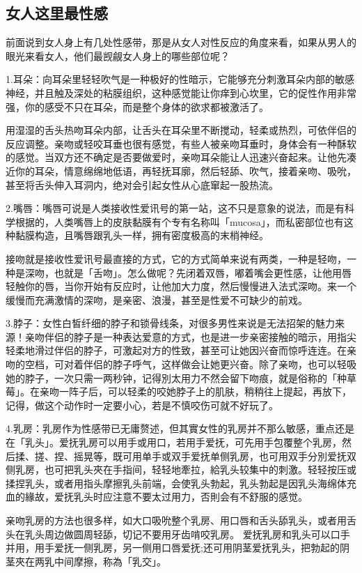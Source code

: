 \documentclass[12pt,UTF8]{ctexbook}
\begin{document}
\subsection{女人这里最性感}

前面说到女人身上有几处性感带，那是从女人对性反应的角度来看，如果从男人的眼光来看女人，他们最觊觎女人身上的哪些部位呢？

1.耳朵：向耳朵里轻轻吹气是一种极好的性暗示，它能够充分刺激耳朵内部的敏感神经，并且触及深处的粘膜组织，这种感觉能让你痒到心坎里，它的促性作用非常强，你的感受不只在耳朵，而是整个身体的欲求都被激活了。

用湿湿的舌头热吻耳朵内部，让舌头在耳朵里不断搅动，轻柔或热烈，可依伴侣的反应调整。亲吻或轻咬耳垂也很有感觉，有些人被亲吻耳垂时，身体会有一种酥软的感觉。当双方还不确定是否要做爱时，亲吻耳朵能让人迅速兴奋起来。让他先凑近你的耳朵，情意绵绵地低语，再轻抚耳廓，然后轻舔、吹气，接着亲吻、吸吮，甚至将舌头伸入耳洞内，绝对会引起女性从心底窜起一股热流。

2.嘴唇：嘴唇可说是人类接收性爱讯号的第一站，这不只是意象的说法，而是有科学根据的，人类嘴唇上的皮肤黏膜有个专有名称叫「mucosa」，而私密部位也有这种黏膜构造，且嘴唇跟乳头一样，拥有密度极高的末梢神经。

接吻就是接收性爱讯号最直接的方式，它的方式简单来说有两类，一种是轻吻，一种是深吻，也就是「舌吻」。怎么做呢？先闭着双唇，嘟着嘴会更性感，让他用唇轻触你的唇，当你开始有反应时，让他加大力度，然后慢慢进入法式深吻。来一个缓慢而充满激情的深吻，是亲密、浪漫，甚至是性爱不可缺少的前戏。

3.脖子：女性白皙纤细的脖子和锁骨线条，对很多男性来说是无法招架的魅力来源！亲吻伴侣的脖子是一种表达爱意的方式，也是进一步亲密接触的暗示，用指尖轻柔地滑过伴侣的脖子，可激起对方的性致，甚至可让她因兴奋而惊呼连连。在亲吻的空档，可对着伴侣的脖子呼气，这样做会让她更兴奋。除了亲吻，也可以轻吸她的脖子，一次只需一两秒钟，记得別太用力不然会留下吻痕，就是俗称的「种草莓」。在亲吻一阵子后，可以轻柔的咬她脖子上的肌肤，稍稍往上提起，再放下，记得，做这个动作时一定要小心，若是不慎咬伤可就不好玩了。

4.乳房：乳房作为性感带已无庸赘述，但其實女性的乳房并不那么敏感，重点还是在「乳头」。爱抚乳房可以用手或用口，若用手爱抚，可先用手包覆整个乳房，然后揉、搓、捏、摇晃等，既可用单手或双手爱抚单侧乳房，也可用双手分別爱抚双侧乳房，也可把乳头夾在手指间，轻轻地牽拉，給乳头较集中的刺激。轻轻按压或揉捏乳头，或者用指头摩擦乳头前端，会使乳头勃起，乳头勃起是因乳头海绵体充血的緣故，爱抚乳头时应注意不要太过用力，否則会有不舒服的感觉。

亲吻乳房的方法也很多样，如大口吸吮整个乳房、用口唇和舌头舔乳头，或者用舌头在乳头周边做圆周轻舔，切记不要用牙齿啃咬乳房。
爱抚乳房和乳头可以口手并用，用手爱抚一侧乳房，另一侧用口唇爱抚;还可用阴茎爱抚乳头，把勃起的阴茎夾在两乳中间摩擦，称為「乳交」。
\end{document}
